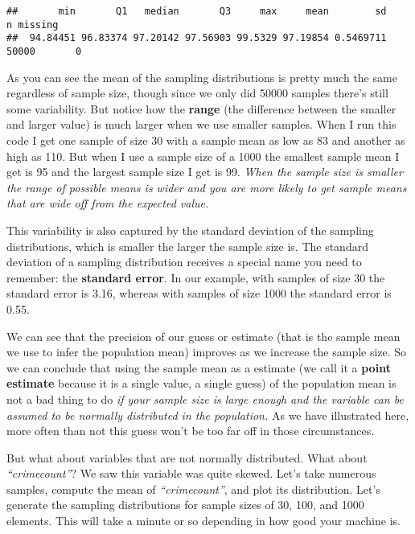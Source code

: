 \documentclass[
]{book}
\begin{document}
\begin{verbatim}
##       min       Q1   median       Q3     max     mean        sd     n missing
##  94.84451 96.83374 97.20142 97.56903 99.5329 97.19854 0.5469711 50000       0
\end{verbatim}

As you can see the mean of the sampling distributions is pretty much the same regardless of sample size, though since we only did 50000 samples there's still some variability. But notice how the \textbf{range} (the difference between the smaller and larger value) is much larger when we use smaller samples. When I run this code I get one sample of size 30 with a sample mean as low as 83 and another as high as 110. But when I use a sample size of a 1000 the smallest sample mean I get is 95 and the largest sample size I get is 99. \emph{When the sample size is smaller the range of possible means is wider and you are more likely to get sample means that are wide off from the expected value.}

This variability is also captured by the standard deviation of the sampling distributions, which is smaller the larger the sample size is. The standard deviation of a sampling distribution receives a special name you need to remember: the \textbf{standard error}. In our example, with samples of size 30 the standard error is 3.16, whereas with samples of size 1000 the standard error is 0.55.

We can see that the precision of our guess or estimate (that is the sample mean we use to infer the population mean) improves as we increase the sample size. So we can conclude that using the sample mean as a estimate (we call it a \textbf{point estimate} because it is a single value, a single guess) of the population mean is not a bad thing to do \emph{if your sample size is large enough and the variable can be assumed to be normally distributed in the population.} As we have illustrated here, more often than not this guess won't be too far off in those circumstances.

But what about variables that are not normally distributed. What about \emph{``crimecount''}? We saw this variable was quite skewed. Let's take numerous samples, compute the mean of \emph{``crimecount''}, and plot its distribution. Let's generate the sampling distributions for sample sizes of 30, 100, and 1000 elements. This will take a minute or so depending in how good your machine is.
\end{document}
